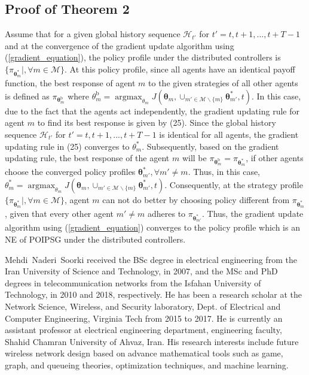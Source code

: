 \documentclass[conference]{IEEEtran}
\begin{document}
\subsection{Proof of Theorem 2}
Assume that for a given global history sequence $\mathcal{H}_{t'}$ for $t'=t, t+1, ..., t+T-1$ and at the convergence of the gradient update algorithm using (\ref{gradient_equation}), the policy profile under the distributed controllers is $\{\pi_{\boldsymbol{\theta}^*_m}|,\forall m\in \mathcal{M}\}$. At this policy profile, since all agents have an identical payoff function, the best response of agent $m$ to the given strategies of all other agents is defined as $\pi_{\boldsymbol{\theta}^{\text{b}}_m}$ where $\theta^{\text{b}}_m=\operatorname*{argmax}_{\theta_m} J(\boldsymbol{\theta}_m, \cup_{m' \in \mathcal{M} \backslash \{m\}} \boldsymbol{\theta}^*_{m'} ,t)$. In this case,  due to the fact that the agents act independently, the gradient updating rule for agent $m$ to find its best response is given by (25). Since the global history sequence $\mathcal{H}_{t'}$ for $t'=t, t+1, ..., t+T-1$ is identical for all agents, the gradient updating rule in (25) converges to $\theta_m^*$. Subsequently, based on the gradient updating rule, the best response of the agent $m$ will be $\pi_{\boldsymbol{\theta}^{\text{b}}_m}=\pi_{\boldsymbol{\theta}^{*}_m}$, if other agents choose the converged policy profiles $\boldsymbol{\theta}^*_{m'},\forall m'\neq m$. Thus, in this case, $\theta^*_m=\operatorname*{argmax}_{\theta_m} J(\boldsymbol{\theta}_m, \cup_{m' \in \mathcal{M} \backslash \{m\}} \boldsymbol{\theta}^*_{m'} ,t)$. Consequently, at the strategy profile $\{\pi_{\boldsymbol{\theta}^*_m}|,\forall m\in \mathcal{M}\}$, agent $m$ can not do better by choosing policy different from $\pi_{\boldsymbol{\theta}^*_m}$ , given that every other agent $m'\neq m$ adheres to $\pi_{\boldsymbol{\theta}^*_{m'}}$. Thus, the gradient update algorithm using (\ref{gradient_equation}) converges to the policy profile which is an NE of POIPSG under the distributed controllers.

\def\baselinestretch{0.985}



\vspace{-0.8cm}

\begin{IEEEbiography} Mehdi~Naderi~Soorki received the BSc degree in electrical engineering from the Iran University of Science and Technology, in 2007, and the MSc and PhD degrees in telecommunication networks from the Isfahan University of Technology, in 2010 and 2018, respectively. He has been a research scholar at the Network Science, Wireless, and Security laboratory, Dept. of Electrical and Computer Engineering, Virginia Tech from 2015 to 2017. He is currently an assistant professor at electrical engineering department, engineering faculty, Shahid Chamran University of Ahvaz, Iran. His research interests include future wireless network design based on advance mathematical tools such as
game, graph, and queueing theories, optimization techniques, and machine learning.
\end{IEEEbiography}
\vfill
\end{document}
